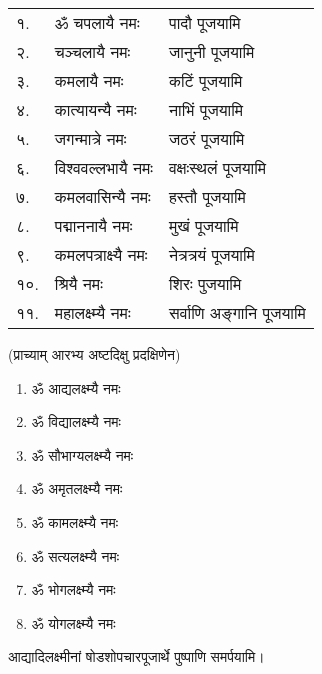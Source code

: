 \begin{longtable}{ll@{— }l}
१.& ॐ चपलायै नमः & पादौ पूजयामि \\
२.& चञ्चलायै नमः & जानुनी पूजयामि\\
३.& कमलायै नमः & कटिं पूजयामि  \\
४.& कात्यायन्यै नमः & नाभिं पूजयामि\\
५.& जगन्मात्रे नमः & जठरं पूजयामि   \\
६.& विश्ववल्लभायै नमः & वक्षःस्थलं पूजयामि \\
७.& कमलवासिन्यै नमः & हस्तौ पूजयामि        \\
८.& पद्माननायै नमः & मुखं पूजयामि\\
९.& कमलपत्राक्ष्यै नमः & नेत्रत्रयं पूजयामि    \\
१०.& श्रियै नमः & शिरः पुजयामि\\
११.& महालक्ष्म्यै नमः & सर्वाणि अङ्गानि पूजयामि   \\
\end{longtable}

(प्राच्याम् आरभ्य अष्टदिक्षु प्रदक्षिणेन)

\begin{multicols}{2}
\begin{enumerate}
\item ॐ आद्यलक्ष्म्यै नमः
\item ॐ विद्यालक्ष्म्यै नमः
\item ॐ सौभाग्यलक्ष्म्यै नमः
\item ॐ अमृतलक्ष्म्यै नमः
\item ॐ कामलक्ष्म्यै नमः 
\item ॐ सत्यलक्ष्म्यै नमः
\item ॐ भोगलक्ष्म्यै नमः
\item ॐ योगलक्ष्म्यै नमः
\end{enumerate}
\end{multicols}

आद्यादिलक्ष्मीनां षोडशोपचारपूजार्थे पुष्पाणि समर्पयामि।

